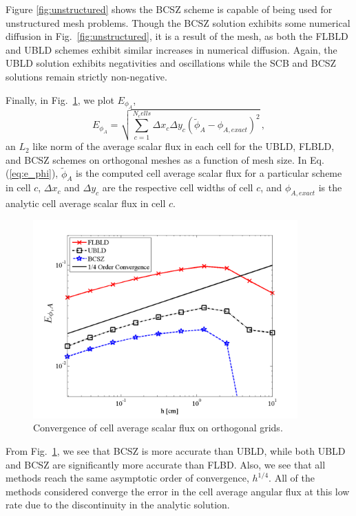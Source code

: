 \documentclass{mc2015}
\newcommand{\fig}[1]{Fig.~\ref{#1}}                      %
\newcommand{\benum}{\begin{equation}} 			%
\newcommand{\eenum}{\end{equation}}
\newcommand{\eqt}[1]{Eq. (\ref{#1})}  %
\newcommand{\pec}{\, ,}
\begin{document}
Figure \ref{fig:unstructured} shows the BCSZ scheme is capable of being used for unstructured mesh problems.
Though the BCSZ solution exhibits some numerical diffusion in \fig{fig:unstructured}, it is a result of the mesh, as both the FLBLD and UBLD schemes exhibit similar increases in numerical diffusion.  Again, the UBLD solution exhibits negativities and oscillations while the SCB and BCSZ solutions remain strictly non-negative.

Finally, in \fig{fig:convergence}, we plot $E_{\phi_A}$,
\benum
\label{eq:e_phi}
E_{\phi_A} = \sqrt{ \sum_{c=1}^{N_cells}{ \Delta x_c \Delta y_c (\widetilde{\phi}_A - \phi_{A,exact} )^2} } \pec
\eenum
an $L_2$ like norm of the average scalar flux in each cell for the UBLD, FLBLD, and BCSZ schemes on orthogonal meshes as a function of mesh size.  
In \eqt{eq:e_phi}, $\widetilde{\phi}_A$ is the computed cell average scalar flux for a particular scheme in cell $c$, $\Delta x_c$ and $\Delta y_c$ are the respective cell widths of cell $c$, and $\phi_{A,exact}$ is the analytic cell average scalar flux in cell $c$.
\begin{figure}[h]
\centering
\includegraphics[width=4in]{glance_convergence}
\caption{Convergence of cell average scalar flux on orthogonal grids.}
\label{fig:convergence}
\end{figure}
From \fig{fig:convergence}, we see that BCSZ is more accurate than UBLD, while both UBLD and BCSZ are significantly more accurate than FLBD.
Also, we see that all methods reach the same asymptotic order of convergence, $h^{1/4}$.
All of the methods considered converge the error in the cell average angular flux at this low rate due to the discontinuity in the analytic solution.
\end{document}
